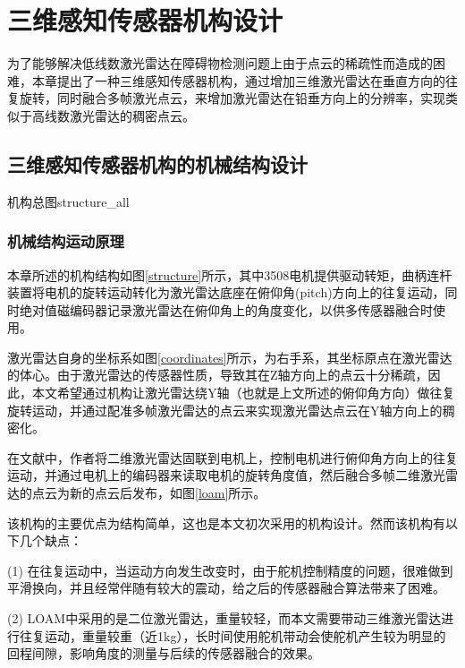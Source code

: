 
\chapter{三维感知传感器机构设计}
为了能够解决低线数激光雷达在障碍物检测问题上由于点云的稀疏性而造成的困难，本章提出了一种三维感知传感器机构，通过增加三维激光雷达在垂直方向的往复旋转，同时融合多帧激光点云，来增加激光雷达在铅垂方向上的分辨率，实现类似于高线数激光雷达的稠密点云。

\section{三维感知传感器机构的机械结构设计}
\begin{pics}[htbp]{机构总图}{structure_all}
\end{pics}
\subsection{机械结构运动原理}
本章所述的机构结构如图\ref{structure}所示，其中3508电机提供驱动转矩，曲柄连杆装置将电机的旋转运动转化为激光雷达底座在俯仰角(pitch)方向上的往复运动，同时绝对值磁编码器记录激光雷达在俯仰角上的角度变化，以供多传感器融合时使用。


激光雷达自身的坐标系如图\ref{coordinates}所示，为右手系，其坐标原点在激光雷达的体心。由于激光雷达的传感器性质，导致其在Z轴方向上的点云十分稀疏，因此，本文希望通过机构让激光雷达绕Y轴（也就是上文所述的俯仰角方向）做往复旋转运动，并通过配准多帧激光雷达的点云来实现激光雷达点云在Y轴方向上的稠密化。

在文献中，作者将二维激光雷达固联到电机上，控制电机进行俯仰角方向上的往复运动，并通过电机上的编码器来读取电机的旋转角度值，然后融合多帧二维激光雷达的点云为新的点云后发布，如图\ref{loam}所示。

该机构的主要优点为结构简单，这也是本文初次采用的机构设计。然而该机构有以下几个缺点：

(1) 在往复运动中，当运动方向发生改变时，由于舵机控制精度的问题，很难做到平滑换向，并且经常伴随有较大的震动，给之后的传感器融合算法带来了困难。

(2) LOAM中采用的是二位激光雷达，重量较轻，而本文需要带动三维激光雷达进行往复运动，重量较重（近1kg），长时间使用舵机带动会使舵机产生较为明显的回程间隙，影响角度的测量与后续的传感器融合的效果。

